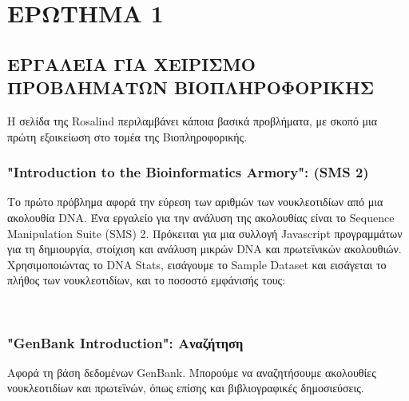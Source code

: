 \chapter{ΕΡΩΤΗΜΑ 1}

    \section{ΕΡΓΑΛΕΙΑ ΓΙΑ ΧΕΙΡΙΣΜΟ ΠΡΟΒΛΗΜΑΤΩΝ ΒΙΟΠΛΗΡΟΦΟΡΙΚΗΣ}

        Η σελίδα της Rosalind περιλαμβάνει κάποια βασικά προβλήματα, με σκοπό μια πρώτη εξοικείωση στο τομέα της Βιοπληροφορικής.

    \subsection{"Introduction to the Bioinformatics Armory": (SMS 2)}
        Το πρώτο πρόβλημα αφορά την εύρεση των αριθμών των νουκλεοτιδίων από μια ακολουθία DNA.
        Ένα εργαλείο για την ανάλυση της ακολουθίας είναι το Sequence Manipulation Suite (SMS) 2.
        Πρόκειται για μια συλλογή Javascript προγραμμάτων για τη δημιουργία, στοίχιση και ανάλυση μικρών DNA και πρωτεϊνικών ακολουθιών. \cite{SMS2}
        Χρησιμοποιώντας το DNA Stats, εισάγουμε το Sample Dataset και εισάγεται το πλήθος των νουκλεοτιδίων, και το ποσοστό εμφάνισής τους:
        \vspace{-10pt}
        \begin{table}[ht] \noindent\centering\tt
        \end{table}
        \vspace{-10pt}

    \subsection{"GenBank Introduction": Αναζήτηση}
        Αφορά τη βάση δεδομένων GenBank. \cite{GenBank} Μπορούμε να αναζητήσουμε ακολουθίες νουκλεοτιδίων και πρωτεϊνών, όπως επίσης και βιβλιογραφικές δημοσιεύσεις.

